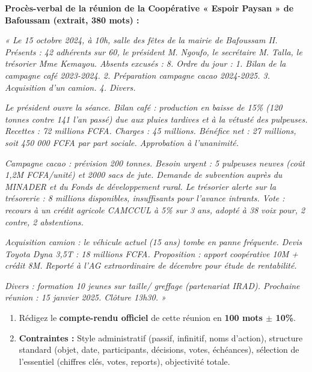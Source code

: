 \documentclass[11pt]{article}
\begin{document}
\begin{exercice}
\textbf{Procès-verbal de la réunion de la Coopérative « Espoir Paysan » de Bafoussam (extrait, 380 mots) :}

\emph{« Le 15 octobre 2024, à 10h, salle des fêtes de la mairie de Bafoussam II. Présents : 42 adhérents sur 60, le président M. Ngoufo, le secrétaire M. Talla, le trésorier Mme Kemayou. Absents excusés : 8. Ordre du jour : 1. Bilan de la campagne café 2023-2024. 2. Préparation campagne cacao 2024-2025. 3. Acquisition d'un camion. 4. Divers.}

\emph{Le président ouvre la séance. Bilan café : production en baisse de 15\% (120 tonnes contre 141 l'an passé) due aux pluies tardives et à la vétusté des pulpeuses. Recettes : 72 millions FCFA. Charges : 45 millions. Bénéfice net : 27 millions, soit 450 000 FCFA par part sociale. Approbation à l'unanimité.}

\emph{Campagne cacao : prévision 200 tonnes. Besoin urgent : 5 pulpeuses neuves (coût 1,2M FCFA/unité) et 2000 sacs de jute. Demande de subvention auprès du MINADER et du Fonds de développement rural. Le trésorier alerte sur la trésorerie : 8 millions disponibles, insuffisants pour l'avance intrants. Vote : recours à un crédit agricole CAMCCUL à 5\% sur 3 ans, adopté à 38 voix pour, 2 contre, 2 abstentions.}

\emph{Acquisition camion : le véhicule actuel (15 ans) tombe en panne fréquente. Devis Toyota Dyna 3,5T : 18 millions FCFA. Proposition : apport coopérative 10M + crédit 8M. Reporté à l'AG extraordinaire de décembre pour étude de rentabilité.}

\emph{Divers : formation 10 jeunes sur taille/ greffage (partenariat IRAD). Prochaine réunion : 15 janvier 2025. Clôture 13h30. »}

\begin{enumerate}
    \item Rédigez le \textbf{compte-rendu officiel} de cette réunion en \textbf{100 mots $\pm$ 10\%}.
    \item \textbf{Contraintes :} Style administratif (passif, infinitif, noms d'action), structure standard (objet, date, participants, décisions, votes, échéances), sélection de l'essentiel (chiffres clés, votes, reports), objectivité totale.
\end{enumerate}
\end{exercice}
\end{document}
